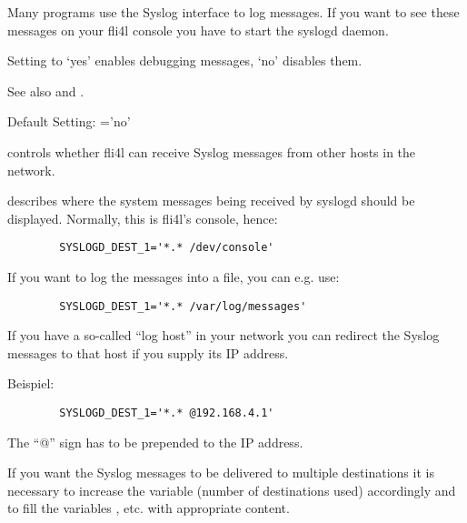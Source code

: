  Many programs use the Syslog interface to log messages. If you want to see
  these messages on your fli4l console you have to start the syslogd daemon.

  Setting  to `yes' enables debugging messages, `no'
  disables them.

  See also  and
  .


  Default Setting: ='no'

  \begin{description}

   controls whether fli4l can receive Syslog messages
  from other hosts in the network.


   describes where the system messages
  being received by syslogd should be displayed. Normally, this is fli4l's console,
  hence:

\begin{example}
\begin{verbatim}
        SYSLOGD_DEST_1='*.* /dev/console'
\end{verbatim}
\end{example}

  If you want to log the messages into a file, you can e.g. use:

\begin{example}
\begin{verbatim}
        SYSLOGD_DEST_1='*.* /var/log/messages'
\end{verbatim}
\end{example}

  If you have a so-called ``log host'' in your network you can redirect the
  Syslog messages to that host if you supply its IP address.

  Beispiel:
\begin{example}
\begin{verbatim}
        SYSLOGD_DEST_1='*.* @192.168.4.1'
\end{verbatim}
\end{example}

  The ``@'' sign has to be prepended to the IP address.

  If you want the Syslog messages to be delivered to multiple destinations
  it is necessary to increase the variable  (number of
  destinations used) accordingly and to fill the variables
  ,  etc. with appropriate content.


\end{description}
